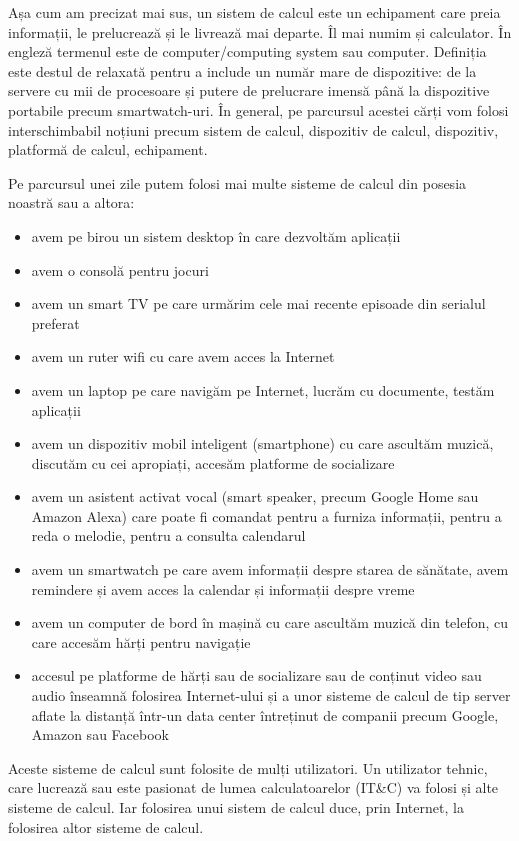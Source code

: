 Așa cum am precizat mai sus, un sistem de calcul este un echipament care preia informații, le prelucrează și le livrează mai departe. Îl mai numim și calculator. În engleză termenul este de computer/computing system sau computer. Definiția este destul de relaxată pentru a include un număr mare de dispozitive: de la servere cu mii de procesoare și putere de prelucrare imensă până la dispozitive portabile precum smartwatch-uri. În general, pe parcursul acestei cărți vom folosi interschimbabil noțiuni precum sistem de calcul, dispozitiv de calcul, dispozitiv, platformă de calcul, echipament.

Pe parcursul unei zile putem folosi mai multe sisteme de calcul din posesia noastră sau a altora:

\begin{itemize}
  \item avem pe birou un sistem desktop în care dezvoltăm aplicații
  \item avem o consolă pentru jocuri
  \item avem un smart TV pe care urmărim cele mai recente episoade din serialul preferat
  \item avem un ruter wifi cu care avem acces la Internet
  \item avem un laptop pe care navigăm pe Internet, lucrăm cu documente, testăm aplicații
  \item avem un dispozitiv mobil inteligent (smartphone) cu care ascultăm muzică, discutăm cu cei apropiați, accesăm platforme de socializare
  \item avem un asistent activat vocal (smart speaker, precum Google Home sau Amazon Alexa) care poate fi comandat pentru a furniza informații, pentru a reda o melodie, pentru a consulta calendarul
  \item avem un smartwatch pe care avem informații despre starea de sănătate, avem remindere și avem acces la calendar și informații despre vreme
  \item avem un computer de bord în mașină cu care ascultăm muzică din telefon, cu care accesăm hărți pentru navigație
  \item accesul pe platforme de hărți sau de socializare sau de conținut video sau audio înseamnă folosirea Internet-ului și a unor sisteme de calcul de tip server aflate la distanță într-un data center întreținut de companii precum Google, Amazon sau Facebook
\end{itemize}

Aceste sisteme de calcul sunt folosite de mulți utilizatori. Un utilizator tehnic, care lucrează sau este pasionat de lumea calculatoarelor (IT\&C) va folosi și alte sisteme de calcul. Iar folosirea unui sistem de calcul duce, prin Internet, la folosirea altor sisteme de calcul.

